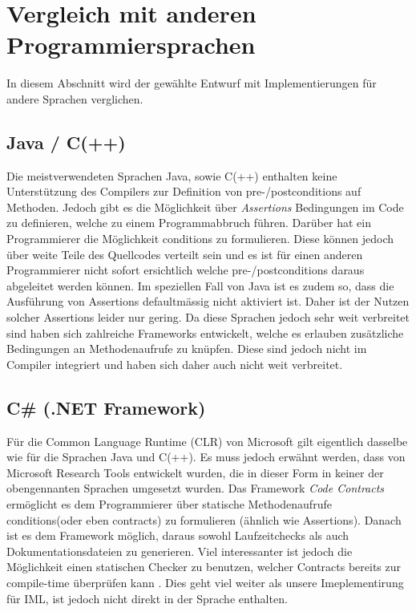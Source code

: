 \section{Vergleich mit anderen Programmiersprachen}
In diesem Abschnitt wird der gewählte Entwurf mit Implementierungen
für andere Sprachen verglichen.

\subsection{Java / C(++)}
Die meistverwendeten Sprachen Java, sowie C(++) enthalten keine Unterstützung des Compilers 
zur Definition von pre-/postconditions auf Methoden. Jedoch gibt es die Möglichkeit 
über \textit{Assertions} Bedingungen im Code zu definieren, welche zu einem Programmabbruch führen.
Darüber hat ein Programmierer die Möglichkeit conditions zu formulieren. Diese können jedoch über weite
Teile des Quellcodes verteilt sein und es ist für einen anderen Programmierer nicht 
sofort ersichtlich welche pre-/postconditions daraus abgeleitet werden können. Im speziellen 
Fall von Java ist es zudem so, dass die Ausführung von Assertions defaultmässig nicht aktiviert 
ist. Daher ist der Nutzen solcher Assertions leider nur gering. Da diese Sprachen jedoch 
sehr weit verbreitet sind haben sich zahlreiche Frameworks entwickelt, welche es erlauben
zusätzliche Bedingungen an Methodenaufrufe zu knüpfen. Diese sind jedoch nicht im Compiler integriert
und haben sich daher auch nicht weit verbreitet.

\subsection{C\# (.NET Framework)}

Für die Common Language Runtime (CLR) von Microsoft gilt eigentlich dasselbe wie für die Sprachen 
Java und C(++). Es muss jedoch erwähnt werden, dass von Microsoft Research Tools entwickelt wurden, 
die in dieser Form in keiner der obengennanten Sprachen umgesetzt wurden. Das Framework 
\textit{Code Contracts} ermöglicht es dem Programmierer über statische Methodenaufrufe 
conditions(oder eben contracts) zu formulieren (ähnlich wie Assertions). 
Danach ist es dem Framework möglich, daraus sowohl Laufzeitchecks als auch 
Dokumentationsdateien zu generieren. Viel interessanter ist jedoch die Möglichkeit einen 
statischen Checker zu benutzen, welcher Contracts bereits zur compile-time überprüfen 
kann \cite{MS:StaticAnalysis}. Dies geht viel weiter als unsere Imeplementirung für IML, 
ist jedoch nicht direkt in der Sprache enthalten.

